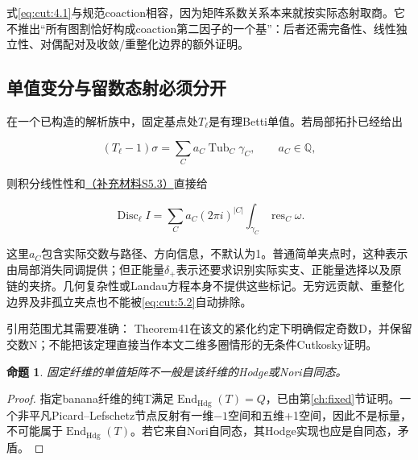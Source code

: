\documentclass[11pt,a4paper,oneside]{ctexart}
\theoremstyle{cnplain}
\newtheorem{proposition}[theorem]{命题}
\theoremstyle{definition}
\theoremstyle{remark}
\numberwithin{equation}{section}
\newcommand{\otherref}[2]{\href{#1.pdf}{#2}}
\begin{document}
式\eqref{eq:cut:4.1}与规范coaction相容，因为矩阵系数关系本来就按实际态射取商。它不推出``所有图割恰好构成coaction第二因子的一个基''：后者还需完备性、线性独立性、对偶配对及收敛/重整化边界的额外证明。


\subsection{单值变分与留数态射必须分开}\label{sec:cut:5}

在一个已构造的解析族中，固定基点处\(T_\ell \)是有理Betti单值。若局部拓扑已经给出

\begin{equation}
(T_\ell-1)\sigma=\sum_C a_C\operatorname{Tub}_C\gamma_C,
 \qquad a_C\in\mathbb Q,                              \label{eq:cut:5.1}
\end{equation}

则积分线性性和\otherref{feynman_periods_supplement}{（补充材料S5.3）}直接给

\begin{equation}
\operatorname{Disc}_\ell I
     =\sum_C a_C(2\pi i)^{|C|}
                      \int_{\gamma_C}\operatorname{res}_C\omega.
                                                               \label{eq:cut:5.2}
\end{equation}

这里\(a_C\)包含实际交数与路径、方向信息，不默认为1。普通简单夹点时，这种表示由局部消失同调提供；但正能量\(\delta _+\)表示还要求识别实际实支、正能量选择以及原链的夹挤。几何复杂性或Landau方程本身不提供这些标记。无穷远贡献、重整化边界及非孤立夹点也不能被\eqref{eq:cut:5.2}自动排除。

引用范围尤其需要准确：\cite{muhlbauer} Theorem41在该文的紧化约定下明确假定奇数D，并保留交数N；不能把该定理直接当作本文二维多圈情形的无条件Cutkosky证明。

\begin{proposition}

\label{thm:cut:5.1} 固定纤维的单值矩阵不一般是该纤维的Hodge或Nori自同态。

\end{proposition}

\begin{proof}

指定banana纤维的纯T满足\(\operatorname{End}_{\mathrm{Hdg}}(T)=Q\)，已由第\ref{ch:fixed}节证明。一个非平凡Picard--Lefschetz节点反射有一维\(- 1\)空间和五维+1空间，因此不是标量，不可能属于\(\operatorname{End}_{\mathrm{Hdg}}(T)\)。若它来自Nori自同态，其Hodge实现也应是自同态，矛盾。

\end{proof}
\end{document}
